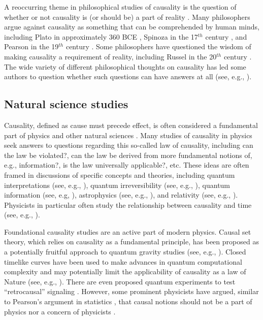 A reoccurring theme in philosophical studies of causality is the question of whether or not causality is (or should be) a part of reality \cite{Zheng2010,Illari2014}.  Many philosophers argue against causality as something that can be comprehended by human minds, including Plato in approximately 360 BCE \cite{Plato2010}, Spinoza in the 17$^{th}$ century \cite{Spinoza1955}, and Pearson in the 19$^{th}$ century \cite{Pearson1903}.  Some philosophers have questioned the wisdom of making causality a requirement of reality, including Russel in the 20$^{th}$ century \cite{Russell1912,Russell1948}.  The wide variety of different philosophical thoughts on causality has led some authors to question whether such questions can have answers at all (see, e.g., \cite{Shugan2007,Illari2011b,Salmon1998}).

\subsection{Natural science studies} 
Causality, defined as cause must precede effect, is often considered a fundamental part of physics and other natural sciences \cite{Bohm1971,Bunge1979}.  Many studies of causality in physics seek answers to questions regarding this so-called law of causality, including can the law be violated?, can the law be derived from more fundamental notions of, e.g., information?, is the law universally applicable?, etc.  These ideas are often framed in discussions of specific concepts and theories, including quantum interpretations (see, e.g., \cite{Bohr1963,Bohr1937,Riggs2009}), quantum irreversibility (see, e.g., \cite{Bohm2013}), quantum information (see, e.g, \cite{Pawlowski2009,Kuzmich2001}), astrophysics (see, e.g., \cite{Smolin2006,Gibbons1999}), and relativity (see, e.g., \cite{Zeeman1964,Tipler1977,Liberati2002}).  Physicists in particular often study the relationship between causality and time (see, e.g., \cite{Ellis2005,Barbour1999,Schulman1997,Penrose1999}).

Foundational causality studies are an active part of modern physics.  Causal set theory, which relies on causality as a fundamental principle, has been proposed as a potentially fruitful approach to quantum gravity studies (see, e.g., \cite{Dowker2006,Bombelli1987}).  Closed timelike curves \cite{Thorne1993} have been used to make advances in quantum computational complexity \cite{Aaronson2009} and may potentially limit the applicability of causality as a law of Nature (see, e.g., \cite{Lobo2003,Korotaev2015}).  There are even proposed quantum experiments to test ``retrocausal'' signaling \cite{Cramer2014}.  However, some prominent physicists have argued, similar to Pearson's argument in statistics \cite{Pearson1903}, that causal notions should not be a part of physics nor a concern of physicists \cite{Mach1986}.

